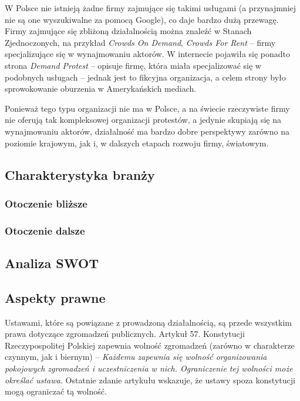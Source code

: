 \documentclass{article}
\begin{document}
W Polsce nie istnieją żadne firmy zajmujące się takimi usługami (a przynajmniej nie są one wyszukiwalne za pomocą Google), co daje bardzo dużą przewagę. Firmy zajmujące się zbliżoną działalnością można znaleźć w Stanach Zjednoczonych, na przykład \textit{Crowds On Demand}, \textit{Crowds For Rent} -- firmy specjalizujące się w wynajmowaniu aktorów. W internecie pojawiła się ponadto strona \textit{Demand Protest} -- opisuje firmę, która miała specjalizować się w podobnych usługach -- jednak jest to fikcyjna organizacja, a celem strony było sprowokowanie oburzenia w Amerykańskich mediach. 

Ponieważ tego typu organizacji nie ma w Polsce, a na świecie rzeczywiste firmy nie oferują tak kompleksowej organizacji protestów, a jedynie skupiają się na wynajmowaniu aktorów, działalność ma bardzo dobre perspektywy zarówno na poziomie krajowym, jak i, w dalszych etapach rozwoju firmy, światowym. 

\subsection{Charakterystyka branży}
\subsubsection{Otoczenie bliższe} %
\subsubsection{Otoczenie dalsze} %
\subsection{Analiza SWOT}
\subsection{Aspekty prawne}
Ustawami, które są powiązane z prowadzoną działalnością, są przede wszystkim prawa dotyczące zgromadzeń publicznych. Artykuł 57. Konstytucji Rzeczypospolitej Polskiej zapewnia wolność zgromadzeń (zarówno w charakterze czynnym, jak i biernym) -- \textit{Każdemu zapewnia się wolność organizowania pokojowych zgromadzeń i uczestniczenia w nich. Ograniczenie tej wolności może określać ustawa.} Ostatnie zdanie artykułu wskazuje, że ustawy spoza konstytucji mogą ograniczać tą wolność. 
\end{document}

